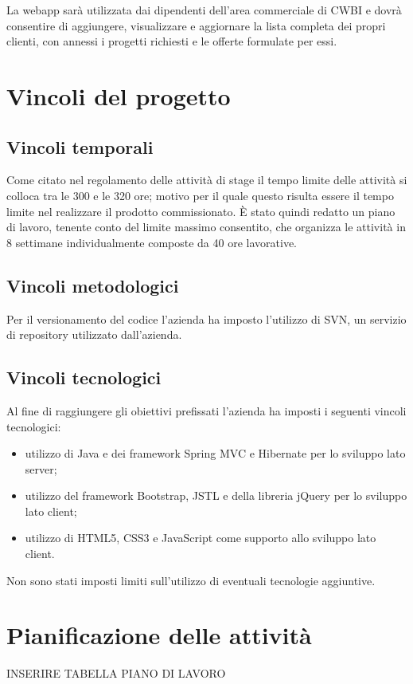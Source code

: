 \noindent La webapp sarà utilizzata dai dipendenti dell'area commerciale di CWBI e dovrà consentire di aggiungere, visualizzare e aggiornare la lista completa dei propri clienti, con annessi i progetti richiesti e le offerte formulate per essi. 

\setlength{\parskip}{3ex}

\section{Vincoli del progetto}
\subsection{Vincoli temporali}
Come citato nel regolamento delle attività di stage il tempo limite delle attività si colloca tra le 300 e le 320 ore; motivo per il quale questo risulta essere il tempo limite nel realizzare il prodotto commissionato. È stato quindi redatto un piano di lavoro, tenente conto del limite massimo consentito, che organizza le attività in 8 settimane individualmente composte da 40 ore lavorative.  

\subsection{Vincoli metodologici}
Per il versionamento del codice l'azienda ha imposto l'utilizzo di SVN, un servizio di repository utilizzato dall'azienda. 

\subsection{Vincoli tecnologici}
Al fine di raggiungere gli obiettivi prefissati l'azienda ha imposti i seguenti vincoli tecnologici:
\begin{itemize}
\item utilizzo di Java e dei framework Spring MVC e Hibernate per lo sviluppo lato server;
\item utilizzo del framework Bootstrap, JSTL e della libreria jQuery per lo sviluppo lato client;
\item utilizzo di HTML5, CSS3 e JavaScript come supporto allo sviluppo lato client.
\end{itemize}
Non sono stati imposti limiti sull’utilizzo di eventuali tecnologie aggiuntive.

\section{Pianificazione delle attività}
INSERIRE TABELLA PIANO DI LAVORO
